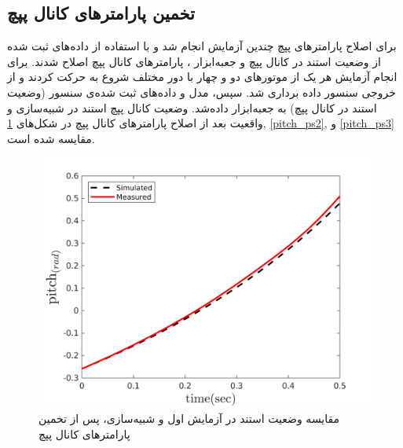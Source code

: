\subsection{تخمین پارامترهای کانال پپچ}
برای اصلاح پارامترهای پپچ چندین آزمایش انجام شد و با استفاده از داده‌های ثبت شده از وضعیت استند در کانال پپچ و جعبه‌ابزار
،
پارامترهای کانال پپچ اصلاح شدند.
برای انجام آزمایش هر یک از موتورهای دو و چهار  با دور مختلف شروع به حرکت کردند و از خروجی سنسور داده برداری شد. سپس، مدل و داده‌های ثبت شده‌ی سنسور (وضعیت استند در کانال پپچ) به جعبه‌ابزار
داده‌شد. وضعیت کانال پپچ استند در شبیه‌سازی و واقعیت بعد از اصلاح پارامترهای کانال پپچ در شکل‌های
\ref{pitch_ps1}, \ref{pitch_ps2}, و \ref{pitch_ps3}
مقایسه شده است.

\begin{figure}[H]
	\includegraphics[width=.55\linewidth]{../Figures/RCP/pitch_parameter_estimation/RCP_pitch_S1.png}
	\centering
	\caption{مقايسه وضعیت استند در  آزمايش اول و شبیه‌سازی، پس از تخمین پارامترهای کانال پپچ}
	\label{pitch_ps1}
\end{figure}
